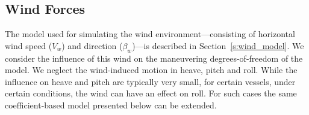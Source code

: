\documentclass[utf8]{frontiersSCNS} %
\begin{document}

\subsection{Wind Forces}
The model used for simulating the wind environment---consisting of horizontal wind speed ($V_w$) and direction ($\beta_w$)---is described in Section~\ref{s:wind_model}. We consider the influence of this wind on the maneuvering degrees-of-freedom of the model. We neglect the wind-induced motion in heave, pitch and roll. While the influence on heave and pitch are typically very small, for certain vessels, under certain conditions, the wind can have an effect on roll. For such cases the same coefficient-based model presented below can be extended.
\end{document}
